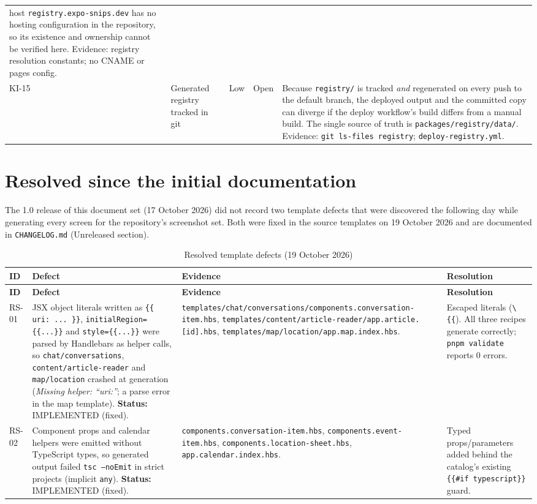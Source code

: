 \begin{longtable}{@{}L{1.2cm}L{3.3cm}L{1.6cm}L{1.1cm}L{6.4cm}@{}}
host \texttt{registry.expo-snips.dev} has no hosting configuration in the
repository, so its existence and ownership cannot be verified here. Evidence:
registry resolution constants; no CNAME or pages config. \\
KI-15 & Generated registry tracked in git & Low & Open & Because
\texttt{registry/} is tracked \emph{and} regenerated on every push to the default
branch, the deployed output and the committed copy can diverge if the deploy
workflow's build differs from a manual build. The single source of truth is
\texttt{packages/registry/data/}. Evidence: \texttt{git ls-files registry};
\texttt{deploy-registry.yml}. \\
\bottomrule
\end{longtable}

\section{Resolved since the initial documentation}

The 1.0 release of this document set (17 October 2026) did not record two
template defects that were discovered the following day while generating every
screen for the repository's screenshot set. Both were fixed in the source
templates on 19 October 2026 and are documented in \texttt{CHANGELOG.md}
(Unreleased section).

\begin{longtable}{@{}L{1.6cm}L{4.6cm}L{4.4cm}L{3.4cm}@{}}
\caption{Resolved template defects (19 October 2026)}\\
\toprule
\textbf{ID} & \textbf{Defect} & \textbf{Evidence} & \textbf{Resolution} \\
\midrule
\endfirsthead
\toprule
\textbf{ID} & \textbf{Defect} & \textbf{Evidence} & \textbf{Resolution} \\
\midrule
\endhead
RS-01 & JSX object literals written as \texttt{\{\{ uri: ... \}\}},
\texttt{initialRegion=\{\{...\}\}} and \texttt{style=\{\{...\}\}} were parsed by
Handlebars as helper calls, so \texttt{chat/conversations},
\texttt{content/article-reader} and \texttt{map/location} crashed at generation
(\emph{Missing helper: ``uri:''}; a parse error in the map template).
\textbf{Status:} IMPLEMENTED (fixed). &
\texttt{templates/chat/conversations/components.conversation-item.hbs},
\texttt{templates/content/article-reader/app.article.[id].hbs},
\texttt{templates/map/location/app.map.index.hbs}. &
Escaped literals (\texttt{\textbackslash\{\{}). All three recipes generate correctly;
\texttt{pnpm validate} reports 0 errors. \\
RS-02 & Component props and calendar helpers were emitted without TypeScript
types, so generated output failed \texttt{tsc --noEmit} in strict projects
(implicit \texttt{any}).
\textbf{Status:} IMPLEMENTED (fixed). &
\texttt{components.conversation-item.hbs}, \texttt{components.event-item.hbs},
\texttt{components.location-sheet.hbs}, \texttt{app.calendar.index.hbs}. &
Typed props/parameters added behind the catalog's existing
\texttt{\{\{#if typescript\}\}} guard. \\
\bottomrule
\end{longtable}

